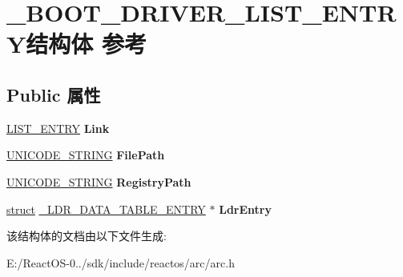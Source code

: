 \hypertarget{struct___b_o_o_t___d_r_i_v_e_r___l_i_s_t___e_n_t_r_y}{}\section{\+\_\+\+B\+O\+O\+T\+\_\+\+D\+R\+I\+V\+E\+R\+\_\+\+L\+I\+S\+T\+\_\+\+E\+N\+T\+R\+Y结构体 参考}
\label{struct___b_o_o_t___d_r_i_v_e_r___l_i_s_t___e_n_t_r_y}
\subsection*{Public 属性}
\begin{DoxyCompactItemize}
\item 
\mbox{\label{struct___b_o_o_t___d_r_i_v_e_r___l_i_s_t___e_n_t_r_y_a7f1fe0306c7a92ef5ef3d8e0e6959e4c}} 
\hyperlink{struct___l_i_s_t___e_n_t_r_y}{L\+I\+S\+T\+\_\+\+E\+N\+T\+RY} {\bfseries Link}
\item 
\mbox{\label{struct___b_o_o_t___d_r_i_v_e_r___l_i_s_t___e_n_t_r_y_ac8490ae677d6df0a3b0910675d13b0c0}} 
\hyperlink{struct___u_n_i_c_o_d_e___s_t_r_i_n_g}{U\+N\+I\+C\+O\+D\+E\+\_\+\+S\+T\+R\+I\+NG} {\bfseries File\+Path}
\item 
\mbox{\label{struct___b_o_o_t___d_r_i_v_e_r___l_i_s_t___e_n_t_r_y_a8890ceae0b70258491fcbebf83e0fbba}} 
\hyperlink{struct___u_n_i_c_o_d_e___s_t_r_i_n_g}{U\+N\+I\+C\+O\+D\+E\+\_\+\+S\+T\+R\+I\+NG} {\bfseries Registry\+Path}
\item 
\mbox{\label{struct___b_o_o_t___d_r_i_v_e_r___l_i_s_t___e_n_t_r_y_ac990accd79f4676331b1aa34538d5ba2}} 
\hyperlink{interfacestruct}{struct} \hyperlink{struct___l_d_r___d_a_t_a___t_a_b_l_e___e_n_t_r_y}{\+\_\+\+L\+D\+R\+\_\+\+D\+A\+T\+A\+\_\+\+T\+A\+B\+L\+E\+\_\+\+E\+N\+T\+RY} $\ast$ {\bfseries Ldr\+Entry}
\end{DoxyCompactItemize}


该结构体的文档由以下文件生成\+:\begin{DoxyCompactItemize}
\item 
E\+:/\+React\+O\+S-\/0../sdk/include/reactos/arc/arc.\+h\end{DoxyCompactItemize}
